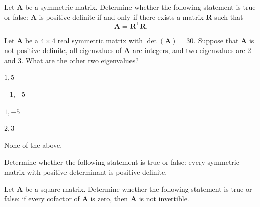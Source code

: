 \documentclass[11pt,oneside]{article}
\begin{document}
\begin{problem}
Let $\mathbf A$ be a symmetric matrix. Determine whether the following statement is true or false: $\mathbf A$ is positive definite if and only if there exists a matrix $\mathbf R$ such that
\[
\mathbf A=\mathbf R^{\mathsf T}\mathbf R.
\]
\end{problem}

\begin{problem}
Let $\mathbf A$ be a $4\times4$ real symmetric matrix with $\det(\mathbf A)=30$. Suppose that $\mathbf A$ is not positive definite, all eigenvalues of $\mathbf A$ are integers, and two eigenvalues are $2$ and $3$. What are the other two eigenvalues?
\begin{problemchoices}
\item $1,5$
\item $-1,-5$
\item $1,-5$
\item $2,3$
\item None of the above.
\end{problemchoices}
\end{problem}

\begin{problem}
Determine whether the following statement is true or false: every symmetric matrix with positive determinant is positive definite.
\end{problem}

\begin{problem}
Let $\mathbf A$ be a square matrix. Determine whether the following statement is true or false: if every cofactor of $\mathbf A$ is zero, then $\mathbf A$ is not invertible.
\end{problem}
\end{document}
